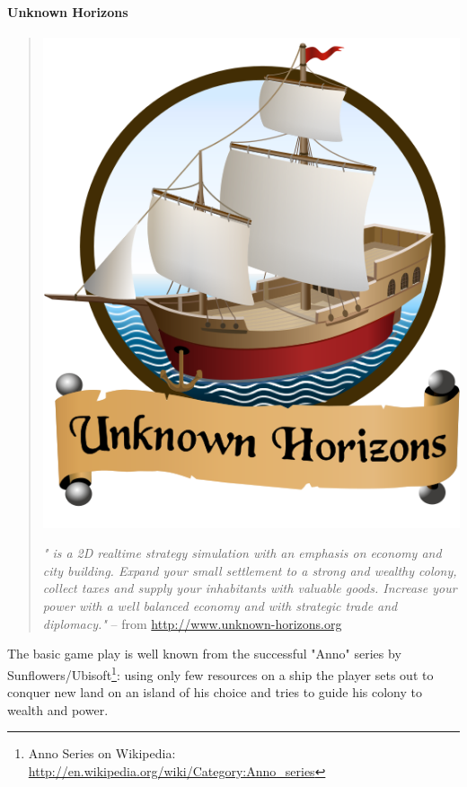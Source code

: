 \paragraph{Unknown Horizons}
\begin{quote}
\begin{center}\includegraphics[scale=0.2]{pics/uhlogo}\end{center}
\textit{"\UH{} is a 2D realtime strategy simulation with an emphasis on economy and city building. Expand your small settlement
to a strong and wealthy colony, collect taxes and supply your inhabitants with valuable goods. Increase your power with
a well balanced economy and with strategic trade and diplomacy."} -- from \url{http://www.unknown-horizons.org}
\end{quote}

The basic game play is well known from the successful "Anno" series by Sunflowers/Ubisoft\footnote{Anno Series on
Wikipedia: \url{http://en.wikipedia.org/wiki/Category:Anno_series}}: using only few resources on a ship the player sets
out to conquer new land on an island of his choice and tries to guide his colony to wealth and power.

